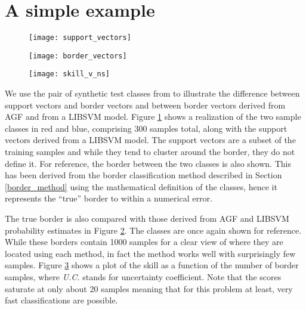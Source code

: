 \documentclass[11pt]{article}
\begin{document}
\section{A simple example}

\begin{figure}
\texttt{[image: support\_vectors]}
\label{sample_sv}
\end{figure}

\begin{figure}
\texttt{[image: border\_vectors]}
\label{sample_border}
\end{figure}

\begin{figure}
\texttt{[image: skill\_v\_ns]}
\label{skill_v_ns}
\end{figure}

We use the pair of synthetic test classes from \citet{Mills2011} to illustrate
the difference between support vectors and border vectors and between border
vectors derived from AGF and from a LIBSVM model.
Figure \ref{sample_sv} shows a realization of the two sample classes 
in red and blue, comprising 300 samples total, along
with the support vectors derived from a LIBSVM model.
The support vectors are a subset of the training samples and while they
tend to cluster around the border, they do not define it.
For reference, the border between the two classes is also shown.
This has been derived from the border classification method described in 
Section \ref{border_method} using the mathematical definition of the classes,
hence it represents the ``true'' border to within a numerical error.

The true border is also compared with those derived from AGF and LIBSVM
probability estimates in Figure \ref{sample_border}.
The classes are once again shown for reference.
While these borders contain 1000 samples for a clear view of where
they are located using each method, in fact the method works well with
surprisingly few samples.  Figure \ref{skill_v_ns} shows a plot of the skill
as a function of the number of border samples, where {\it U.C.} stands for
uncertainty coefficient. Note that the scores saturate at only about 20
samples meaning that for this problem at least, very fast classifications are
possible.


\end{document}
